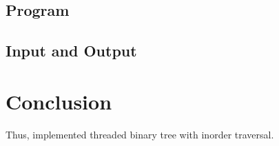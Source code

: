 \documentclass[11pt]{article}
\begin{document}
\subsection{Program}


\subsection{Input and Output}


\section{Conclusion}
Thus, implemented threaded binary tree with inorder traversal.
\clearpage
\end{document}
